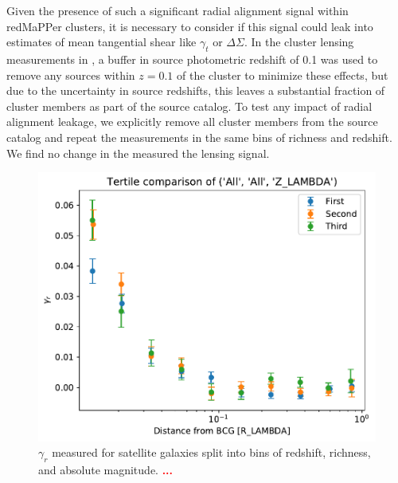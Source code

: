 \documentclass[fleqn,usenatbib]{mnras}
\newcommand{\verify}[1]{\textcolor{red}{\textbf{{#1}}}}
\begin{document}
Given the presence of such a significant radial alignment signal within redMaPPer clusters, it is necessary to consider if this signal could leak into estimates of mean tangential shear like $\gamma_t$ or $\Delta\Sigma$. In the cluster lensing measurements in \cite{}, a buffer in source photometric redshift of 0.1 was used to remove any sources within $z=0.1$ of the cluster to minimize these effects, but due to the uncertainty in source redshifts, this leaves a substantial fraction of cluster members as part of the source catalog. To test any impact of radial alignment leakage, we explicitly remove all cluster members from the source catalog and repeat the measurements in the same bins of richness and redshift. We find no change in the measured the lensing signal.

\begin{figure}
\begin{center}
\includegraphics[width=\columnwidth]{zhou_z_tertile.pdf}
\end{center}
\caption[]{$\gamma_r$ measured for satellite galaxies split into bins of redshift, richness, and absolute magnitude. \verify{...}
\label{fig:gammar2}}
\end{figure}
\end{document}
